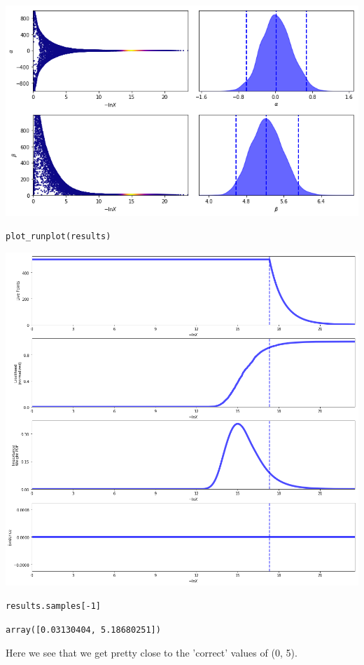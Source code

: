 \documentclass[11pt]{article}
\begin{document}
\includegraphics[width=.9\linewidth]{./obipy-resources/692F1H.png}

\begin{verbatim}
plot_runplot(results)
\end{verbatim}

\includegraphics[width=.9\linewidth]{./obipy-resources/692S_N.png}

\begin{verbatim}
results.samples[-1]
\end{verbatim}

\begin{verbatim}
array([0.03130404, 5.18680251])
\end{verbatim}

Here we see that we get pretty close to the 'correct' values of (0, 5).
\end{document}
